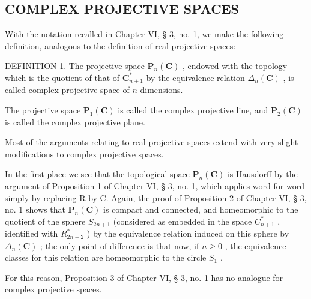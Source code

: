 \subsection{COMPLEX PROJECTIVE SPACES}

With the notation recalled in Chapter VI, § 3, no. 1, we make the following definition, analogous to the definition of real projective spaces:

DEFINITION 1. The projective space \(\mathbf{P}_{n}(\mathbf{C})\) , endowed with the topology which is the quotient of that of \(\mathbf{C}_{n+1}^{*}\) by the equivalence relation \(\Delta_{n}(\mathbf{C})\) , is called complex projective space of \(n\) dimensions.

The projective space \(\mathbf{P}_{1}(\mathbf{C})\) is called the complex projective line, and \(\mathbf{P}_{2}(\mathbf{C})\) is called the complex projective plane.

Most of the arguments relating to real projective spaces extend with very slight modifications to complex projective spaces.

In the first place we see that the topological space \(\mathbf{P}_{n}(\mathbf{C})\) is Hausdorff by the argument of Proposition 1 of Chapter VI, § 3, no. 1, which applies word for word simply by replacing R by C. Again, the proof of Proposition 2 of Chapter VI, § 3, no. 1 shows that \(\mathbf{P}_{n}(\mathbf{C})\) is compact and connected, and homeomorphic to the quotient of the sphere \(S_{2n+1}\) (considered as embedded in the space \(C_{n+1}^{*}\) , identified with \(R_{2n+2}^{*}\) ) by the equivalence relation induced on this sphere by \(\Delta_{n}(\mathbf{C})\) ; the only point of difference is that now, if \(n \geqslant 0\) , the equivalence classes for this relation are homeomorphic to the circle \(S_{1}\) .

For this reason, Proposition 3 of Chapter VI, § 3, no. 1 has no analogue for complex projective spaces.

